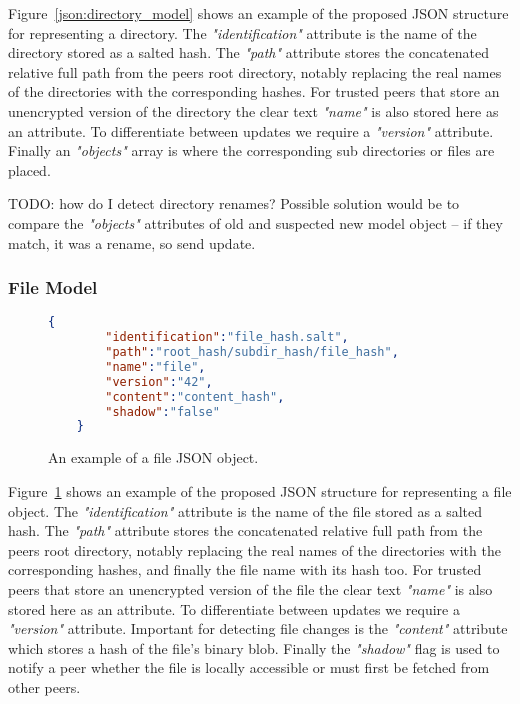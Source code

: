 Figure~\ref{json:directory_model} shows an example of the proposed JSON structure for representing a directory.
The \textit{"identification"} attribute is the name of the directory stored as a salted hash.
The \textit{"path"} attribute stores the concatenated relative full path from the peers root directory, notably replacing the real names of the directories with the corresponding hashes.
For trusted peers that store an unencrypted version of the directory the clear text \textit{"name"} is also stored here as an attribute.
To differentiate between updates we require a \textit{"version"} attribute.
Finally an \textit{"objects"} array is where the corresponding sub directories or files are placed.

TODO: how do I detect directory renames?
Possible solution would be to compare the \textit{"objects"} attributes of old and suspected new model object – if they match, it was a rename, so send update.

\subsubsection{File Model}
\label{sec:file_model}

\begin{figure}[htp]
    \begin{lstlisting}[language=json,firstnumber=0]
    {
        "identification":"file_hash.salt",
        "path":"root_hash/subdir_hash/file_hash",
        "name":"file",
        "version":"42",
        "content":"content_hash",
        "shadow":"false"
    }
    \end{lstlisting}
\caption[File JSON Model]{An example of a file JSON object.}
\label{json:file_model}
\end{figure}

Figure~\ref{json:file_model} shows an example of the proposed JSON structure for representing a file object.
The \textit{"identification"} attribute is the name of the file stored as a salted hash.
The \textit{"path"} attribute stores the concatenated relative full path from the peers root directory, notably replacing the real names of the directories with the corresponding hashes, and finally the file name with its hash too.
For trusted peers that store an unencrypted version of the file the clear text \textit{"name"} is also stored here as an attribute.
To differentiate between updates we require a \textit{"version"} attribute.
Important for detecting file changes is the \textit{"content"} attribute which stores a hash of the file's binary blob.
Finally the \textit{"shadow"} flag is used to notify a peer whether the file is locally accessible or must first be fetched from other peers.

